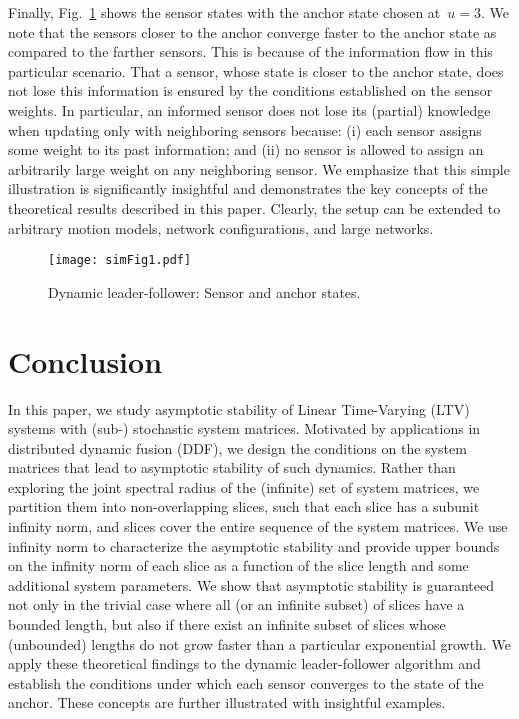 \documentclass[draftclsnofoot, onecolumn, 12pt]{IEEEtran}
\begin{document}
Finally, Fig.~\ref{f4} shows the sensor states with the anchor state chosen at~$u=3$. We note that the sensors closer to the anchor converge faster to the anchor state as compared to the farther sensors. This is because of the information flow in this particular scenario. That a sensor, whose state is closer to the anchor state, does not lose this information is ensured by the conditions established on the sensor weights. In particular, an informed sensor does not lose its (partial) knowledge when updating only with neighboring sensors because: (i) each sensor assigns some weight to its past information; and (ii) no sensor is allowed to assign an arbitrarily large weight on any neighboring sensor. We emphasize that this simple illustration is significantly insightful and demonstrates the key concepts of the theoretical results described in this paper. Clearly, the setup can be extended to arbitrary motion models, network configurations, and large networks. 
\begin{figure}[!h]
\centering
\texttt{[image: simFig1.pdf]}
\caption{Dynamic leader-follower: Sensor and anchor states.}
\label{f4}
\end{figure}


\section{Conclusion}\label{conc}
In this paper, we study asymptotic stability of Linear Time-Varying (LTV) systems with (sub-) stochastic system matrices. Motivated by applications in distributed dynamic fusion (DDF), we design the conditions on the system matrices that lead to asymptotic stability of such dynamics. Rather than exploring the joint spectral radius of the (infinite) set of system matrices, we partition them into non-overlapping slices, such that each slice has a subunit infinity norm, and slices cover the entire sequence of the system matrices. We use infinity norm to characterize the asymptotic stability and provide upper bounds on the infinity norm of each slice as a function of the slice length and some additional system parameters. We show that asymptotic stability is guaranteed not only in the trivial case where all (or an infinite subset) of slices have a bounded length, but also if there exist an infinite subset of slices whose (unbounded) lengths do not grow faster than a particular exponential growth. We apply these theoretical findings to the dynamic leader-follower algorithm and establish the conditions under which each sensor converges to the state of the anchor. These concepts are further illustrated with insightful examples.



\end{document}
